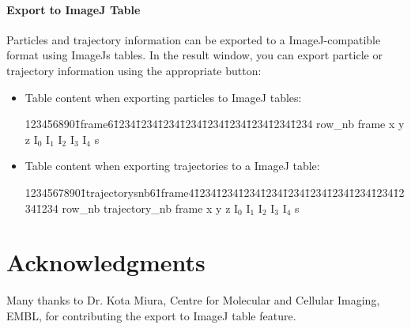 \documentclass{scrartcl}
\begin{document}
\paragraph{Export to ImageJ Table}
Particles and trajectory information can be exported to a ImageJ-compatible format using ImageJs tables. In the result window, you can export particle or trajectory information using the appropriate button:
\begin{itemize}
\item Table content when exporting particles to ImageJ tables:
  { \ttfamily
    \begin{tabbing}
      123456890\=1frame6\=1234\=1234\=1234\=1234\=1234\=1234\=1234\=1234\=1234\kill
      row\_nb \> frame \> x \> y \> z \> I$_0$ \> I$_1$ \> I$_2$ \> I$_3$ \> I$_4$ \> s\\	
    \end{tabbing}
  }
\item Table content when exporting trajectories to a ImageJ table:
  {    \ttfamily
    \begin{tabbing}
      1234567890\=1trajectorysnb6\=1frame4\=1234\=1234\=1234\=1234\=1234\=1234\=1234\=1234\=1234\=1234\=1234\kill
      row\_nb \> trajectory\_nb \> frame \> x \> y \> z \> I$_0$ \> I$_1$ \> I$_2$ \> I$_3$ \> I$_4$ \> s
    \end{tabbing}
  }
\end{itemize}
\section{Acknowledgments}
Many thanks to Dr. Kota Miura, Centre for Molecular and Cellular Imaging, EMBL, for contributing the export to ImageJ table feature.




\end{document}
